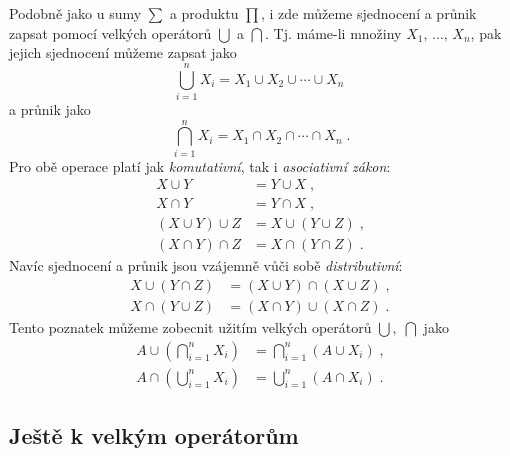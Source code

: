 Podobně jako u sumy $\sum$ a produktu $\prod$, i zde můžeme sjednocení a průnik zapsat pomocí velkých operátorů $\bigcup$ a $\bigcap$. Tj. máme-li množiny $X_1,\,\ldots,\,X_n$, pak jejich sjednocení můžeme zapsat jako
\begin{equation*}
    \bigcup\limits_{i=1}^{n}{X_i}=X_1 \cup X_2 \cup \cdots \cup X_n\;
\end{equation*}
a průnik jako
\begin{equation*}
    \bigcap\limits_{i=1}^{n}{X_i}=X_1 \cap X_2 \cap \cdots \cap X_n\; .
\end{equation*}
Pro obě operace platí jak \emph{komutativní}, tak i \emph{asociativní zákon}:
\begin{align*}
    X \cup Y&=Y \cup X\; ,\\
    X \cap Y&=Y \cap X\; ,\\
    (X \cup Y) \cup Z &= X \cup (Y \cup Z)\; ,\\
    (X \cap Y) \cap Z &= X \cap (Y \cap Z)\; .
\end{align*}
Navíc sjednocení a průnik jsou vzájemně vůči sobě \emph{distributivní}:
\begin{align*}
    X \cup (Y \cap Z) &= (X \cup Y) \cap (X \cup Z)\; ,\\
    X \cap (Y \cup Z) &= (X \cap Y) \cup (X \cap Z)\; .
\end{align*}
Tento poznatek můžeme zobecnit užitím velkých operátorů $\bigcup,\;\bigcap$ jako
\begin{align*}
    A \cup \left(\bigcap\limits_{i=1}^{n}{X_i}\right)&=\bigcap\limits_{i=1}^{n}{(A \cup X_i)}\; ,\\
    A \cap \left(\bigcup\limits_{i=1}^{n}{X_i}\right)&=\bigcup\limits_{i=1}^{n}{(A \cap X_i)}\; .
\end{align*}

\subsection{Ještě k velkým operátorům}\label{subsec:dodatek_velke_operatory}

